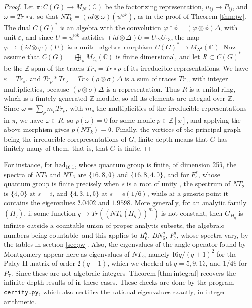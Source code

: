 \documentclass[11pt]{amsart}
\begin{document}
\begin{proof}
Let $\pi:C(G)\to M_N(\mathbb C)$ be the factorizing representation, $u_{ij}\to P_{ij}$, and $\omega=Tr\circ\pi$, so that $NT_k=(id\otimes\omega)(u^{\otimes k})$, as in the proof of Theorem \ref{thm:jw}. The dual $C(G)^*$ is an algebra with the convolution $\varphi*\phi=(\varphi\otimes\phi)\Delta$, with unit $\varepsilon$, and since $U=u^{\otimes k}$ satisfies $(id\otimes\Delta)U=U_{12}U_{13}$, the map $\varphi\to(id\otimes\varphi)(U)$ is a unital algebra morphism $C(G)^*\to M_{N^k}(\mathbb C)$. Now assume that $C(G)=\bigoplus_\rho M_{d_\rho}(\mathbb C)$ is finite dimensional, and let $R\subset C(G)^*$ be the $\mathbb Z$-span of the traces $Tr_\rho=Tr\circ\rho$ of its irreducible representations. We have $\varepsilon=Tr_\varepsilon$, and $Tr_\rho*Tr_\sigma=Tr\circ(\rho\otimes\sigma)\Delta$ is a sum of traces $Tr_\tau$, with integer multiplicities, because $(\rho\otimes\sigma)\Delta$ is a representation. Thus $R$ is a unital ring, which is a finitely generated $\mathbb Z$-module, so all its elements are integral over $\mathbb Z$. Since $\omega=\sum_\rho m_\rho Tr_\rho$, with $m_\rho$ the multiplicities of the irreducible representations in $\pi$, we have $\omega\in R$, so $p(\omega)=0$ for some monic $p\in\mathbb Z[x]$, and applying the above morphism gives $p(NT_k)=0$. Finally, the vertices of the principal graph being the irreducible corepresentations of $G$, finite depth means that $G$ has finitely many of them, that is, that $G$ is finite.
\end{proof}

For instance, for $\mathrm{had}_{16.1}$, whose quantum group is finite, of dimension 256, the spectra of $NT_2$ and $NT_3$ are $\{16,8,0\}$ and $\{16,8,4,0\}$, and for $F_4^s$, whose quantum group is finite precisely when $s$ is a root of unity \cite{bic}, the spectrum of $NT_2$ is $\{4,0\}$ at $s=i$, and $\{4,3,1,0\}$ at $s=e(1/6)$, while at a generic point it contains the eigenvalues $2.0402$ and $1.9598$. More generally, for an analytic family $(H_q)$, if some function $q\to Tr((NT_k(H_q))^m)$ is not constant, then $G_{H_q}$ is infinite outside a countable union of proper analytic subsets, the algebraic numbers being countable, and this applies to $H_6^q$, $BN_6^q$, $P_7^q$, whose spectra vary, by the tables in section \ref{sec:jw}. Also, the eigenvalues of the angle operator found by Montgomery \cite{mo2,mo3} appear here as eigenvalues of $NT_2$, namely $16q/(q+1)^2$ for the Paley II matrix of order $2(q+1)$, which we checked at $q=5,9,13$, and $1/49$ for $P_7$. Since these are not algebraic integers, Theorem \ref{thm:integral} recovers the infinite depth results of \cite{mo2,mo3} in these cases. These checks are done by the program \texttt{certify.py}, which also certifies the rational eigenvalues exactly, in integer arithmetic.
\end{document}
